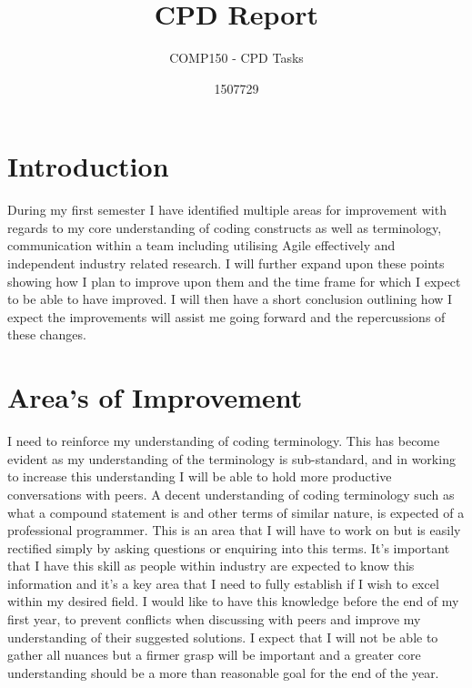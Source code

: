 \documentclass{scrartcl}
\title{CPD Report}
\subtitle{COMP150 - CPD Tasks}
\author{1507729}
\begin{document}
\maketitle

\section{Introduction}

During my first semester I have identified multiple areas for improvement with regards to my core understanding of coding constructs as well as terminology, communication within a team including utilising Agile effectively and independent industry related research. I will further expand upon these points showing how I plan to improve upon them and the time frame for which I expect to be able to have improved. I will then have a short conclusion outlining how I expect the improvements will assist me going forward and the repercussions of these changes.

\section{Area's of Improvement}

I need to reinforce my understanding of coding terminology. This has become evident as my understanding of the terminology is sub-standard, and in working to increase this understanding I will be able to hold more productive conversations with peers. A decent understanding of coding terminology such as what a compound statement is and other terms of similar nature, is expected of a professional programmer. This is an area that I will have to work on but is easily rectified simply by asking questions or enquiring into this terms. It's important that I have this skill as people within industry are expected to know this information and it's a key area that I need to fully establish if I wish to excel within my desired field. I would like to have this knowledge before the end of my first year, to prevent conflicts when discussing with peers and improve my understanding of their suggested solutions. I expect that I will not be able to gather all nuances but a firmer grasp will be important and a greater core understanding should be a more than reasonable goal for the end of the year. \linebreak
\end{document}
